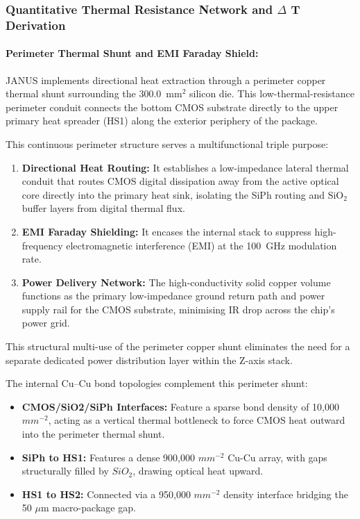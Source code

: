 \documentclass[journal]{IEEEtran}
\begin{document}
\subsubsection{\textbf{Quantitative Thermal Resistance Network and $\Delta$ T Derivation}}

\paragraph{\textbf{Perimeter Thermal Shunt and EMI Faraday Shield:}}

JANUS implements directional heat extraction through a perimeter copper thermal shunt surrounding the 300.0~$\text{mm}^{2}$ silicon die. This low-thermal-resistance perimeter conduit connects the bottom CMOS substrate directly to the upper primary heat spreader (HS1) along the exterior periphery of the package.

This continuous perimeter structure serves a multifunctional triple purpose:
\begin{enumerate}
\item \textbf{Directional Heat Routing:} It establishes a low-impedance lateral thermal conduit that routes CMOS digital dissipation away from the active optical core directly into the primary heat sink, isolating the SiPh routing and $\mathrm{SiO_2}$ buffer layers from digital thermal flux.
\item \textbf{EMI Faraday Shielding:} It encases the internal stack to suppress high-frequency electromagnetic interference (EMI) at the 100~GHz modulation rate.
\item \textbf{Power Delivery Network:} The high-conductivity solid copper volume functions as the primary low-impedance ground return path and power supply rail for the CMOS substrate, minimising IR drop across the chip's power grid.
\end{enumerate}

This structural multi-use of the perimeter copper shunt eliminates the need for a separate dedicated power distribution layer within the Z-axis stack.

The internal Cu--Cu bond topologies complement this perimeter shunt:

\begin{itemize}
\item  \textbf{CMOS/SiO2/SiPh Interfaces:} Feature a sparse bond density of 10,000 $mm^{-2}$, acting as a vertical thermal bottleneck to force CMOS heat outward into the perimeter thermal shunt.
\item  \textbf{SiPh to HS1:} Features a dense 900,000 $mm^{-2}$ Cu-Cu array, with gaps structurally filled by $SiO_2$, drawing optical heat upward.
\item  \textbf{HS1 to HS2:} Connected via a 950,000 $mm^{-2}$ density interface bridging the 50 $\mu$m macro-package gap.
\end{itemize}
\end{document}
